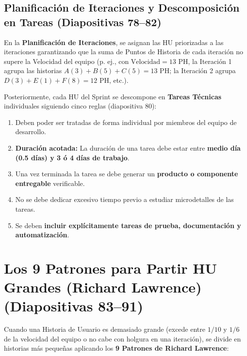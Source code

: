 \subsection{Planificación de Iteraciones y Descomposición en Tareas (Diapositivas 78--82)}

En la \textbf{Planificación de Iteraciones}, se asignan las HU priorizadas a las iteraciones garantizando que la suma de Puntos de Historia de cada iteración no supere la Velocidad del equipo (p. ej., con $\text{Velocidad} = 13\text{ PH}$, la Iteración 1 agrupa las historias $A(3)+B(5)+C(5)=13\text{ PH}$; la Iteración 2 agrupa $D(3)+E(1)+F(8)=12\text{ PH}$, etc.).

Posteriormente, cada HU del Sprint se descompone en \textbf{Tareas Técnicas} individuales siguiendo cinco reglas (diapositiva 80):
\begin{enumerate}[label=\textbf{\arabic*.}, itemsep=2pt]
    \item Deben poder ser tratadas de forma individual por miembros del equipo de desarrollo.
    \item \textbf{Duración acotada:} La duración de una tarea debe estar entre \textbf{medio día (0.5 días) y 3 ó 4 días de trabajo}.
    \item Una vez terminada la tarea se debe generar un \textbf{producto o componente entregable} verificable.
    \item No se debe dedicar excesivo tiempo previo a estudiar microdetalles de las tareas.
    \item Se deben \textbf{incluir explícitamente tareas de prueba, documentación y automatización}.
\end{enumerate}

\section{Los 9 Patrones para Partir HU Grandes (Richard Lawrence) (Diapositivas 83--91)}

Cuando una Historia de Usuario es demasiado grande (excede entre $1/10$ y $1/6$ de la velocidad del equipo o no cabe con holgura en una iteración), se divide en historias más pequeñas aplicando los \textbf{9 Patrones de Richard Lawrence}:

